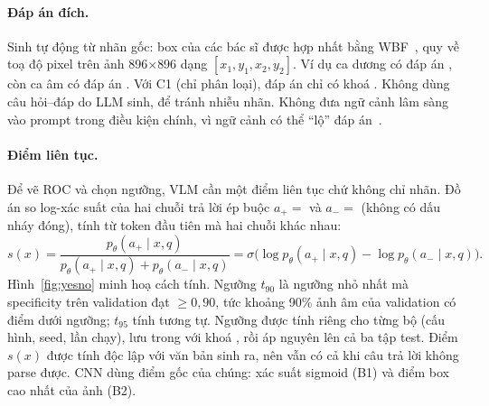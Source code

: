 \paragraph{Đáp án đích.} Sinh tự động từ nhãn gốc: box của các bác sĩ được hợp nhất bằng
WBF~\cite{solovyev2021wbf}, quy về toạ độ pixel trên ảnh 896$\times$896 dạng $[x_1,y_1,x_2,y_2]$. Ví dụ
ca dương có đáp án , còn ca âm có đáp án
. Với C1 (chỉ phân loại), đáp án chỉ có khoá . Không dùng câu
hỏi--đáp do LLM sinh, để tránh nhiễu nhãn. Không đưa ngữ cảnh lâm sàng vào prompt trong điều kiện chính, vì ngữ
cảnh có thể ``lộ'' đáp án~\cite{cusick2026context}.

\paragraph{Điểm liên tục.}\label{sec:score} Để vẽ ROC và chọn ngưỡng, VLM cần một điểm liên tục chứ không chỉ
nhãn. Đồ án so log-xác suất của hai chuỗi trả lời ép buộc $a_{+} = $  và $a_{-} = $
 (không có dấu nháy đóng), tính từ token đầu tiên mà hai chuỗi khác nhau:
\begin{equation}
  s(x) = \frac{p_\theta(a_{+} \mid x, q)}{p_\theta(a_{+} \mid x, q) + p_\theta(a_{-} \mid x, q)} = \sigma\big(\log p_\theta(a_{+} \mid x, q) - \log p_\theta(a_{-} \mid x, q)\big).
\end{equation}
Hình~\ref{fig:yesno} minh hoạ cách tính. Ngưỡng $t_{90}$ là ngưỡng nhỏ nhất mà specificity trên validation đạt
$\ge 0{,}90$, tức khoảng 90\% ảnh âm của validation có điểm dưới ngưỡng; $t_{95}$ tính tương tự. Ngưỡng được tính
riêng cho từng bộ (cấu hình, seed, lần chạy), lưu trong  với khoá ,
rồi áp nguyên lên cả ba tập test. Điểm $s(x)$ được tính độc lập với văn bản sinh ra, nên vẫn có cả khi câu trả lời
không parse được. CNN dùng điểm gốc của chúng: xác suất sigmoid (B1) và điểm box cao nhất của ảnh (B2).


